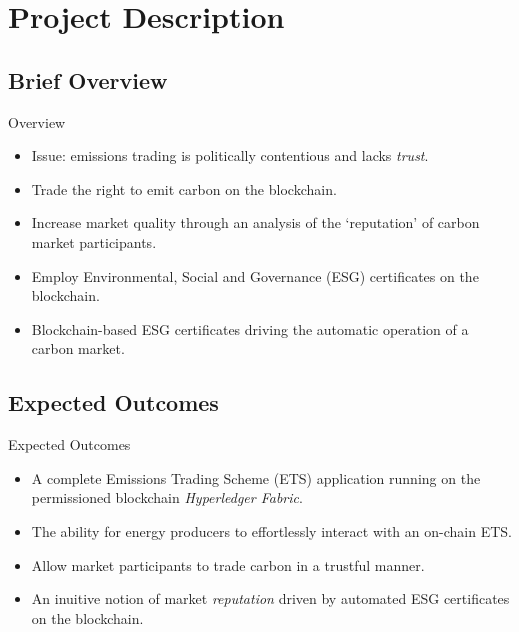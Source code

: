 \section{Project Description}
\subsection{Brief Overview}
\begin{frame}{Overview}
    \begin{itemize}
        \item Issue: emissions trading is politically contentious and lacks
              \textit{trust}.
        \item Trade the right to emit carbon on the blockchain.
        \item Increase market quality through an analysis of the
              `reputation' of carbon market participants.
        \item Employ Environmental, Social and Governance (ESG) certificates
              on the blockchain.
        \item Blockchain-based ESG certificates driving the automatic
              operation of a carbon market.
    \end{itemize}
\end{frame}
\subsection{Expected Outcomes}
\begin{frame}{Expected Outcomes}
    \begin{itemize}
        \item A complete Emissions Trading Scheme (ETS) application running
              on the permissioned blockchain \textit{Hyperledger Fabric}.
        \item The ability for energy producers to effortlessly interact with an
              on-chain ETS.
        \item Allow market participants to trade carbon in a trustful manner.
        \item An inuitive notion of market \textit{reputation} driven by
              automated ESG certificates on the blockchain.
    \end{itemize}
\end{frame}